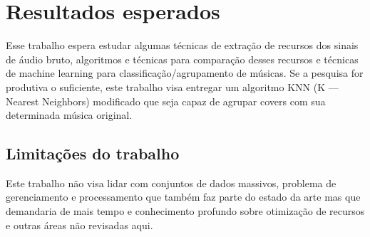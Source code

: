\chapter{Resultados esperados}

Esse trabalho espera estudar algumas técnicas de extração de recursos dos sinais de áudio bruto, algoritmos e técnicas para comparação desses recursos e técnicas de machine learning para classificação/agrupamento de músicas. Se a pesquisa for produtiva o suficiente, este trabalho visa entregar um algoritmo KNN (K — Nearest Neighbors) modificado que seja capaz de agrupar covers com sua determinada música original.

\section{Limitações do trabalho}

Este trabalho não visa lidar com conjuntos de dados massivos, problema de gerenciamento e processamento que também faz parte do estado da arte mas que demandaria de mais tempo e conhecimento profundo sobre otimização de recursos e outras áreas não revisadas aqui. 
